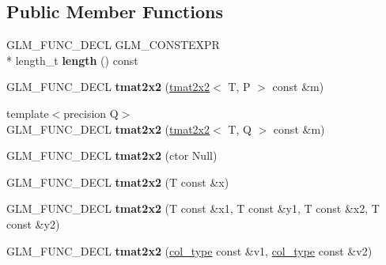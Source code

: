 \subsection*{Public Member Functions}
\begin{DoxyCompactItemize}
\item 
\hypertarget{structglm_1_1detail_1_1tmat2x2_a4d96bf05400619458dd382d9302924a0}{G\-L\-M\-\_\-\-F\-U\-N\-C\-\_\-\-D\-E\-C\-L G\-L\-M\-\_\-\-C\-O\-N\-S\-T\-E\-X\-P\-R \\*
length\-\_\-t {\bfseries length} () const }\label{structglm_1_1detail_1_1tmat2x2_a4d96bf05400619458dd382d9302924a0}

\item 
\hypertarget{structglm_1_1detail_1_1tmat2x2_ace6c970e91f6eace80227602531e4d8a}{G\-L\-M\-\_\-\-F\-U\-N\-C\-\_\-\-D\-E\-C\-L {\bfseries tmat2x2} (\hyperlink{structglm_1_1detail_1_1tmat2x2}{tmat2x2}$<$ T, P $>$ const \&m)}\label{structglm_1_1detail_1_1tmat2x2_ace6c970e91f6eace80227602531e4d8a}

\item 
\hypertarget{structglm_1_1detail_1_1tmat2x2_a0273bde43902469715fd10c0fd06cac4}{{\footnotesize template$<$precision Q$>$ }\\G\-L\-M\-\_\-\-F\-U\-N\-C\-\_\-\-D\-E\-C\-L {\bfseries tmat2x2} (\hyperlink{structglm_1_1detail_1_1tmat2x2}{tmat2x2}$<$ T, Q $>$ const \&m)}\label{structglm_1_1detail_1_1tmat2x2_a0273bde43902469715fd10c0fd06cac4}

\item 
\hypertarget{structglm_1_1detail_1_1tmat2x2_a6b5779f97416696975e15936e8c96e0a}{G\-L\-M\-\_\-\-F\-U\-N\-C\-\_\-\-D\-E\-C\-L {\bfseries tmat2x2} (ctor Null)}\label{structglm_1_1detail_1_1tmat2x2_a6b5779f97416696975e15936e8c96e0a}

\item 
\hypertarget{structglm_1_1detail_1_1tmat2x2_a8fe44c67c08b09a6e1086593b600582d}{G\-L\-M\-\_\-\-F\-U\-N\-C\-\_\-\-D\-E\-C\-L {\bfseries tmat2x2} (T const \&x)}\label{structglm_1_1detail_1_1tmat2x2_a8fe44c67c08b09a6e1086593b600582d}

\item 
\hypertarget{structglm_1_1detail_1_1tmat2x2_ac66f031aca7d5f0e52e92b0c9ab664a7}{G\-L\-M\-\_\-\-F\-U\-N\-C\-\_\-\-D\-E\-C\-L {\bfseries tmat2x2} (T const \&x1, T const \&y1, T const \&x2, T const \&y2)}\label{structglm_1_1detail_1_1tmat2x2_ac66f031aca7d5f0e52e92b0c9ab664a7}

\item 
\hypertarget{structglm_1_1detail_1_1tmat2x2_a98263653fc582781e4babe149a4fdd99}{G\-L\-M\-\_\-\-F\-U\-N\-C\-\_\-\-D\-E\-C\-L {\bfseries tmat2x2} (\hyperlink{structglm_1_1detail_1_1tvec2}{col\-\_\-type} const \&v1, \hyperlink{structglm_1_1detail_1_1tvec2}{col\-\_\-type} const \&v2)}\label{structglm_1_1detail_1_1tmat2x2_a98263653fc582781e4babe149a4fdd99}


\end{DoxyCompactItemize}
